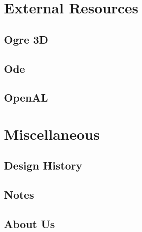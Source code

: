 \documentclass[a4paper]{report}
\begin{document}
\part{External Resources}

	\chapter{Ogre 3D}

	\chapter{Ode}

	\chapter{OpenAL}

\part{Miscellaneous}

	\chapter{Design History}

	\chapter{Notes}

	\chapter{About Us}
\end{document}

